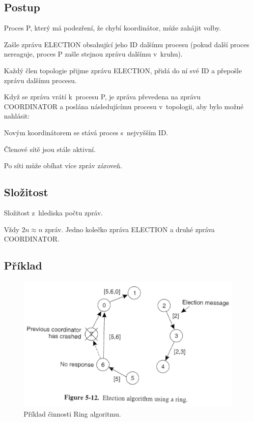 \subsection*{Postup}

\begin{compactitem}
    \item Proces P, který má podezření, že chybí koordinátor, může zahájit volby.
    \begin{compactenum}
        \item Zašle zprávu ELECTION obsahující jeho ID dalšímu procesu (pokud další proces nereaguje, proces P zašle stejnou zprávu dalšímu v~kruhu).
        \item Každý člen topologie přijme zprávu ELECTION, přidá do ní své ID a přepošle zprávu dalšímu procesu.
    \end{compactenum}
    \item Když se zpráva vrátí k~procesu P, je zpráva převedena na zprávu  COORDINATOR a poslána následujícímu procesu v~topologii, aby bylo možné nahlásit:
    \begin{compactenum}
        \item Novým koordinátorem se stává proces s~nejvyšším ID.
        \item Členové sítě jsou stále aktivní.
    \end{compactenum}
    \item Po síti může obíhat více zpráv zároveň.
\end{compactitem}

\subsection*{Složitost}

Složitost z~hlediska počtu zpráv.

\bigskip\noindent Vždy $2n \approx n$ zpráv. Jedno kolečko  zpráva ELECTION a druhé zpráva COORDINATOR.

\subsection*{Příklad}

\begin{figure}[H]
    \centering
    \includegraphics[width=1\linewidth]{example_ring.pdf}
    \caption{Příklad činnosti Ring algoritmu.}
\end{figure}

